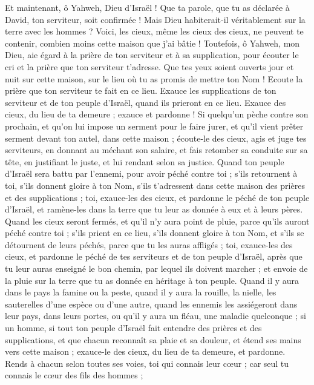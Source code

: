 \begin{multicols}{2}
Et maintenant, ô Yahweh, Dieu d'Israël ! Que ta parole, que tu as déclarée à David, ton serviteur, soit confirmée !
Mais Dieu habiterait-il véritablement sur la terre avec les hommes ? Voici, les cieux, même les cieux des cieux, ne peuvent te contenir, combien moins cette maison que j'ai bâtie !
Toutefois, ô Yahweh, mon Dieu, aie égard à la prière de ton serviteur et à sa supplication, pour écouter le cri et la prière que ton serviteur t'adresse.
Que tes yeux soient ouverts jour et nuit sur cette maison, sur le lieu où tu as promis de mettre ton Nom ! Ecoute la prière que ton serviteur te fait en ce lieu.
Exauce les supplications de ton serviteur et de ton peuple d'Israël, quand ils prieront en ce lieu. Exauce des cieux, du lieu de ta demeure ; exauce et pardonne !
Si quelqu'un pèche contre son prochain, et qu'on lui impose un serment pour le faire jurer, et qu'il vient prêter serment devant ton autel, dans cette maison ;
écoute-le des cieux, agis et juge tes serviteurs, en donnant au méchant son salaire, et fais retomber sa conduite sur sa tête, en justifiant le juste, et lui rendant selon sa justice.
Quand ton peuple d'Israël sera battu par l'ennemi, pour avoir péché contre toi ; s'ils retournent à toi, s'ils donnent gloire à ton Nom, s'ils t'adressent dans cette maison des prières et des supplications ;
toi, exauce-les des cieux, et pardonne le péché de ton peuple d'Israël, et ramène-les dans la terre que tu leur as donnée à eux et à leurs pères.
Quand les cieux seront fermés, et qu'il n'y aura point de pluie, parce qu'ils auront péché contre toi ; s'ils prient en ce lieu, s'ils donnent gloire à ton Nom, et s'ils se détournent de leurs péchés, parce que tu les auras affligés ;
toi, exauce-les des cieux, et pardonne le péché de tes serviteurs et de ton peuple d'Israël, après que tu leur auras enseigné le bon chemin, par lequel ils doivent marcher ; et envoie de la pluie sur la terre que tu as donnée en héritage à ton peuple.
Quand il y aura dans le pays la famine ou la peste, quand il y aura la rouille, la nielle, les sauterelles d'une espèce ou d'une autre, quand les ennemis les assiégeront dans leur pays, dans leurs portes, ou qu'il y aura un fléau, une maladie quelconque ;
si un homme, si tout ton peuple d'Israël fait entendre des prières et des supplications, et que chacun reconnaît sa plaie et sa douleur, et étend ses mains vers cette maison ;
exauce-le des cieux, du lieu de ta demeure, et pardonne. Rends à chacun selon toutes ses voies, toi qui connais leur cœur ; car seul tu connais le cœur des fils des hommes ;

\end{multicols}
